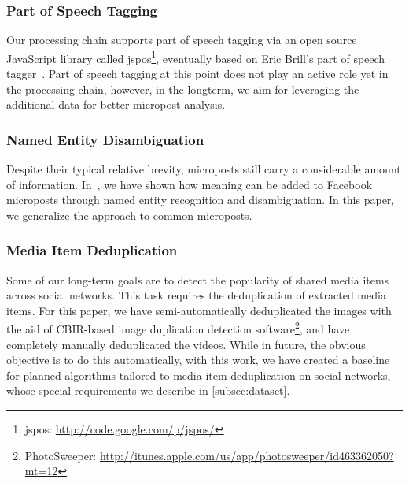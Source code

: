 \documentclass{acm_proc_article-sp}
\newcommand{\inlinelistingsize}{\fontsize{8pt}{11pt}}
\let\oldurl\url
\renewcommand{\url}[1]{\inlinelistingsize\oldurl{#1}}
\begin{document}
\subsubsection{Part of Speech Tagging}
Our processing chain supports part of speech tagging via an open source JavaScript library called jspos\footnote{jspos: \url{http://code.google.com/p/jspos/}},
eventually based on Eric Brill's part of speech tagger~\cite{brill1992simple}.
Part of speech tagging at this point does not play an active role yet in the processing chain, however,
in the longterm, we aim for leveraging the additional data for better micropost analysis.

\subsubsection{Named Entity Disambiguation}
Despite their typical relative brevity, microposts still carry a considerable amount of information.
In~\cite{AddingMeaningToMicroposts}, we have shown how meaning can be added to Facebook microposts through named entity recognition and disambiguation.
In this paper, we generalize the approach to common microposts.

\subsubsection{Media Item Deduplication} \label{sec:deduplication}
Some of our long-term goals are to detect the popularity of shared media items across social networks.
This task requires the deduplication of extracted media items.
For this paper, we have semi-automatically deduplicated the images with the aid of CBIR-based image duplication detection software\footnote{PhotoSweeper: \url{http://itunes.apple.com/us/app/photosweeper/id463362050?mt=12}}, and have completely manually deduplicated the videos.
While in future, the obvious objective is to do this automatically, with this work,
we have created a baseline for planned algorithms tailored to media item deduplication on social networks,
whose special requirements we describe in \autoref{subsec:dataset}.
\end{document}
